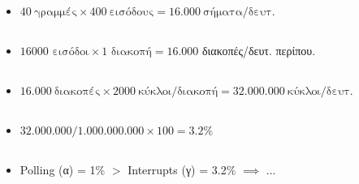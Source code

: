 \documentclass{article}
\begin{document}
\begin{itemize}
    \item {} $40~\text{γραμμές} \times 400~\text{εισόδους} = 16.000~\text{σήματα/δευτ.}$
\end{itemize}
 
\subsection*{}

\begin{itemize}
        \item {} $16000\text{ εισόδοι} \times 1\text{ διακοπή} = 16.000$ διακοπές/δευτ. περίπου.
\end{itemize}

\subsection*{}

\begin{itemize}
    \item {} $16.000~\text{διακοπές} \times 2000~\text{κύκλοι/διακοπή} = 32.000.000~\text{κύκλοι/δευτ.}$
\end{itemize}

\subsection*{}

\begin{itemize}
    \item {} ${32.000.000}/{1.000.000.000} \times 100 = 3.2\%$
\end{itemize}

\subsection*{}

\begin{itemize}
    \item \textlatin{Polling} (α) = {1\%} $>$
    \textlatin{Interrupts} (γ) = {3.2\%} $\implies$  ...
\end{itemize}
 

\subsection*{}
\end{document}
